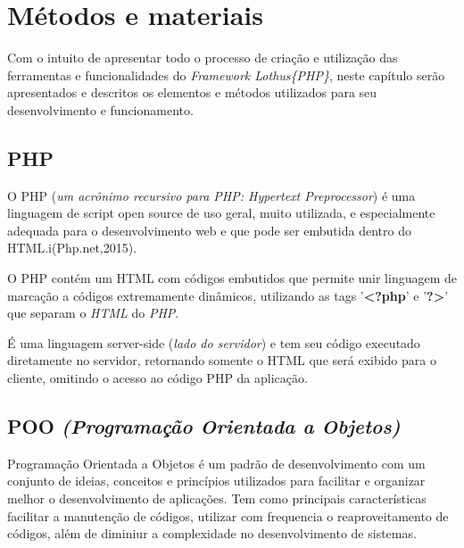 \chapter{Métodos e materiais\label{cap:metodos-materiais}}
    Com o intuito de apresentar todo o processo de criação e utilização das ferramentas e funcionalidades do \emph{Framework Lothus\{PHP\}}, neste capítulo serão apresentados e descritos os elementos e métodos utilizados para seu desenvolvimento e funcionamento.

    \section{PHP\label{sec:php}}
      O PHP (\emph{um acrônimo recursivo para PHP: Hypertext Preprocessor}) é uma linguagem de script open source de uso geral, muito utilizada, e especialmente adequada para o desenvolvimento web e que pode ser embutida dentro do HTML.i(Php.net,2015).

      O PHP contém um HTML com códigos embutidos que permite unir linguagem de marcação a códigos extremamente dinâmicos, utilizando as tags '\textbf{<?php}' e '\textbf{?>}' que separam o \emph{HTML} do \emph{PHP}.

      É uma linguagem server-side (\emph{lado do servidor}) e tem seu código executado diretamente no servidor, retornando somente o HTML que será exibido para o cliente, omitindo o acesso ao código PHP da aplicação.


    \section{POO \emph{(Programação Orientada a Objetos)}\label{sec:poo}}
        Programação Orientada a Objetos é um padrão de desenvolvimento com um conjunto de ideias, conceitos e princípios utilizados para facilitar e organizar melhor o desenvolvimento de aplicações. Tem como principais características facilitar a manutenção de códigos, utilizar com frequencia o reaproveitamento de códigos, além de diminiur a complexidade no desenvolvimento de sistemas.


